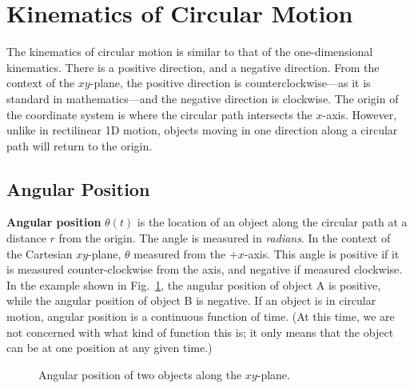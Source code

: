 \section{Kinematics of Circular Motion}
The kinematics of circular motion is similar to that of the one-dimensional
kinematics. There is a positive direction, and a negative direction. From the
context of the $xy$-plane, the positive direction is counterclockwise---as it
is standard in mathematics---and the negative direction is clockwise. The
origin of the coordinate system is where the circular path intersects the
$x$-axis. However, unlike in rectilinear 1D motion, objects moving in one
direction along a circular path will return to the origin.

\subsection{Angular Position}

\textbf{Angular position} $\theta(t)$ is the location of an object along the
circular path at a distance $r$ from the origin. The angle is measured in
\emph{radians}. In the context of the Cartesian $xy$-plane, $\theta$ measured
from the $+x$-axis. This angle is positive if it is measured counter-clockwise
from the axis, and negative if measured clockwise. In the example shown in
Fig.~\ref{fig:angular-position}, the angular position of object A is positive,
while the angular position of object B is negative. If an object is in circular
motion, angular position is a continuous function of time. (At this time, we
are not concerned with what kind of function this is; it only means that the
object can be at one position at any given time.)
\begin{figure}[ht]
  \centering
  \caption{Angular position of two objects along the $xy$-plane.}
  \label{fig:angular-position}
\end{figure}

